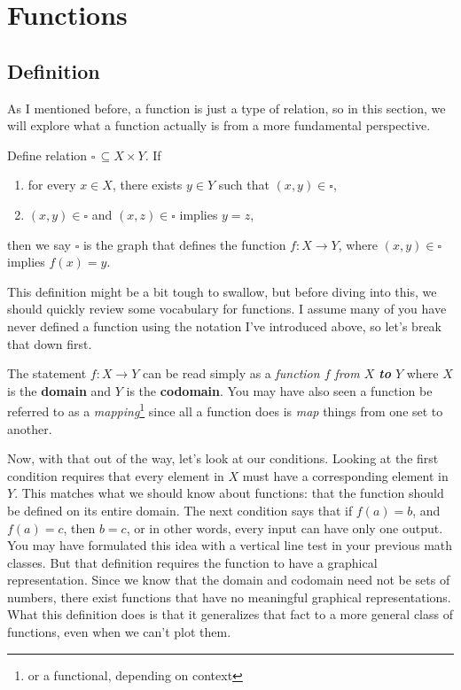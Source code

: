 \section{Functions}
\subsection{Definition}
As I mentioned before, a function is just a type of relation, so in this section, we will explore what a function actually is from a more fundamental perspective.

\begin{define}
	Define relation $\square\,\subseteq X\times Y$. If
	\begin{enumerate}
		\item for every $x\in X$, there exists $y\in Y$ such that $(x,y)\in \square$,
		\item $(x,y)\in \square$ and $(x,z)\in \square$ implies $y=z$,
	\end{enumerate}
	then we say $\square$ is the graph\footnotemark
	that defines the function $f:X\to Y$, where $(x,y)\in\square$ implies $f(x)=y$.
	\label{def:function}
\end{define}

This definition might be a bit tough to swallow, but before diving into this, we should quickly review some vocabulary for functions. I assume many of you have never defined a function using the notation I've introduced above, so let's break that down first.

The statement $f:X\to Y$ can be read simply as a \textit{function $f$ from $X$ \textbf{to} $Y$} where $X$ is the \textbf{domain} and $Y$ is the \textbf{codomain}. 
You may have also seen a function be referred to as a \textit{mapping}\footnote{or a functional, depending on context} since all a function does is \textit{map} things from one set to another.

Now, with that out of the way, let's look at our conditions.
Looking at the first condition requires that every element in $X$ must have a corresponding element in $Y$. 
This matches what we should know about functions: that the function should be defined on its entire domain.
The next condition says that if $f(a)=b$, and $f(a)=c$, then $b=c$, or in other words, every input can have only one output.
You may have formulated this idea with a vertical line test in your previous math classes.
But that definition requires the function to have a graphical representation.
Since we know that the domain and codomain need not be sets of numbers, there exist functions that have no meaningful graphical representations.
What this definition does is that it generalizes that fact to a more general class of functions, even when we can't plot them.

